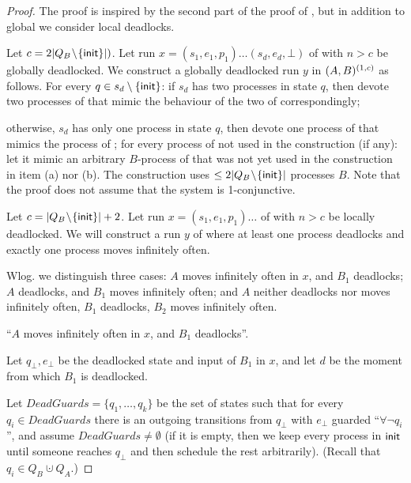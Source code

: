\begin{proof}
The proof is inspired by the second part of the proof of \cite[Lemma 5.2]{Emerson00}, 
but in addition to global we consider local deadlocks. 

Let $c=2|Q_B\!\setminus\!\{ {\sf init} \}|)$. 
Let run $x = (s_1,e_1,p_1)\ldots(s_d,e_d,\bot)$ of \largesys 
with $n>c$ be globally deadlocked. 
We construct a globally deadlocked run $y$ in $(A,B)^{(1,c)}$ as follows.
\li
  \-[a.] For every $q \in s_d \setminus \{{\sf init}\}$:
  \li
    \- if $s_d$ has two processes in state $q$, 
       then devote two processes of \cutoffsys that mimic the behaviour 
       of the two of \largesys correspondingly;

    \- otherwise, $s_d$ has only one process in state $q$, 
       then devote one process of \cutoffsys that mimics the process of \largesys;
  \il
  \-[b.] for every process of \cutoffsys not used in the construction (if any): 
         let it mimic an arbitrary $B$-process of \largesys
         that was not yet used in the construction in item (a) nor (b).
\il
The construction uses $\leq 2|Q_B\!\setminus\! \{ {\sf init} \}|$ processes $B$.
Note that the proof does not assume that the system is 1-conjunctive.

Let $c = |Q_B\!\setminus\! \{ {\sf init} \}|+2$. 
Let run $x = (s_1,e_1,p_1)\ldots$ of \largesys with $n>c$ be locally deadlocked. 
We will construct a run $y$ of \cutoffsys 
where at least one process deadlocks and exactly one process moves infinitely often.

Wlog. we distinguish three cases:
\li
\-[1.] $A$ moves infinitely often in $x$, and $B_1$ deadlocks;
\-[2.] $A$ deadlocks, and $B_1$ moves infinitely often; and
\-[3.] $A$ neither deadlocks nor moves infinitely often, $B_1$ deadlocks, 
       $B_2$ moves infinitely often.
\il

 ``$A$ moves infinitely often in $x$, and $B_1$ deadlocks''.

Let $q_\bot, e_\bot$ be the deadlocked state and input of $B_1$ in $x$, 
and let $d$ be the moment from which $B_1$ is deadlocked.

Let $DeadGuards=\{q_1,\ldots,q_k\}$ be the set of states
such that for every $q_i \in DeadGuards$ there is an outgoing transitions 
from $q_\bot$ with $e_\bot$ guarded ``$\forall \neg q_i$'',
and assume $DeadGuards \neq \emptyset$
(if it is empty, then we keep every process in ${\sf init}$ 
 until someone reaches $q_\bot$ and then schedule the rest arbitrarily). 
(Recall that $q_i \in Q_B \cupdot Q_A$.)


\end{proof}
